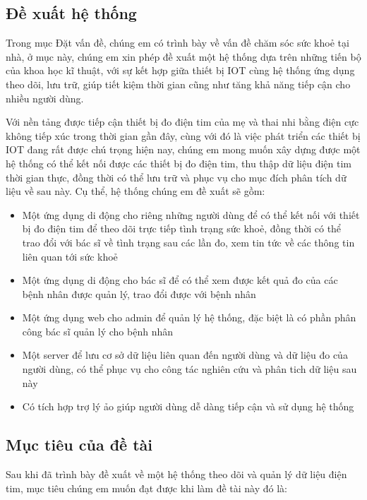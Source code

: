\subsection*{Đề xuất hệ thống}

Trong mục Đặt vấn đề, chúng em có trình bày về vấn đề chăm sóc sức khoẻ tại nhà, ở mục này, chúng em xin phép đề xuất một hệ thống
dựa trên những tiến bộ của khoa học kĩ thuật, với sự kết hợp giữa thiết bị IOT cùng hệ thống ứng dụng theo dõi, lưu trữ,
giúp tiết kiệm thời gian cũng như tăng khả năng tiếp cận cho nhiều người dùng. 

Với nền tảng được tiếp cận thiết bị đo điện tim của mẹ và thai nhi bằng điện cực không tiếp xúc trong thời gian gần đây, 
cùng với đó là việc phát triển các thiết bị IOT đang rất được chú trọng hiện nay, chúng em mong muốn xây dựng được một hệ thống
có thể kết nối được các thiết bị đo điện tim, thu thập dữ liệu điện tim thời gian thực, đồng thời có thể lưu trữ và phục vụ cho mục đích
phân tích dữ liệu về sau này. Cụ thể, hệ thống chúng em đề xuất sẽ gồm:

\begin{adjustwidth}{1.5em}{}
  \begin{itemize}
      \item Một ứng dụng di động cho riêng những người dùng để có thể kết nối với thiết bị đo điện tim để theo dõi trực tiếp tình trạng sức khoẻ, đồng
      thời có thể trao đổi với bác sĩ về tình trạng sau các lần đo, xem tin tức về các thông tin liên quan tới sức khoẻ
      \item Một ứng dụng di động cho bác sĩ để có thể xem được kết quả đo của các bệnh nhân được quản lý, trao đổi được với bệnh nhân
      \item Một ứng dụng web cho admin để quản lý hệ thống, đặc biệt là có phần phân công bác sĩ quản lý cho bệnh nhân
      \item Một server để lưu cơ sở dữ liệu liên quan đến người dùng và dữ liệu đo của người dùng, có thể phục vụ cho công tác nghiên cứu và
      phân tich dữ liệu sau này
      \item Có tích hợp trợ lý ảo giúp người dùng dễ dàng tiếp cận và sử dụng hệ thống
  \end{itemize}
  \end{adjustwidth}


\subsection*{Mục tiêu của đề tài}
Sau khi đã trình bày đề xuất về một hệ thống theo dõi và quản lý dữ liệu điện tim, mục tiêu chúng em muốn đạt được khi
làm đề tài này đó là:

